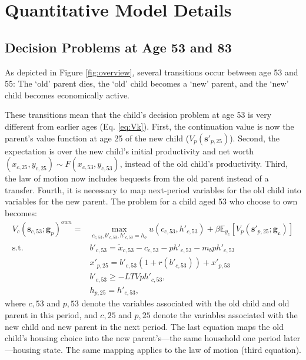 \documentclass[12pt]{article}
\newcommand{\E}{\mathbb{E}}
\begin{document}
\section{Quantitative Model Details} 

\subsection{Decision Problems at Age 53 and 83}\label{sec:decextra}
As depicted in Figure \ref{fig:overview}, several transitions occur between age 53 and 55: The `old' parent dies, the `old' child becomes a `new' parent, and the `new' child becomes economically active. 

These transitions mean that the child's decision problem at age 53 is very different from earlier ages (Eq. \ref{eq:Vk}). First, the continuation value is now the parent's value function at age 25 of the new child ($V_{p}({\mathbf{s}'_{p,25}})$). Second, the expectation is over the new child's initial productivity and net worth $(x_{c,25},y_{c,25})\sim F(x_{c,53},y_{c,53})$, instead of the old child's productivity. Third, the law of motion now includes bequests from the old parent instead of a transfer. Fourth, it is necessary to map next-period variables for the old child into variables for the new parent. The problem for a child aged 53 who choose to own becomes:
\begin{equation*}
\begin{split}
V_c(\mathbf{s}_{c,53};\mathbf{g}_p)^{own} = &\max_{c_{c,53},b'_{c,53},h'_{c,53}=h_o} u(c_{c,53},h'_{c,53}) + \beta \E_{y_c}\left[V_{p}({\mathbf{s}'_{p,25}};\mathbf{g_c}) \right] \\
\text{s.t.}\quad & 	b'_{c,53} = \tilde x_{c,53} - c_{c,53} - p h'_{c,53}  - m_b p h'_{c,53} \\
& x'_{p,25} = b'_{c,53}(1+r(b'_{c,53})) + x'_{p,53} \\
& b'_{c,53} \ge -LTV p h'_{c,53}, \\
& h_{p,25} = h'_{c,53},
\end{split}
\end{equation*} 
where $c,53$ and $p,53$ denote the variables associated with the old child and old parent in this period, and $c,25$ and $p,25$ denote the variables associated with the new child and new parent in the next period. The last equation maps the old child's housing choice into the new parent's---the same household one period later---housing state. The same mapping applies to the law of motion (third equation).
\end{document}
